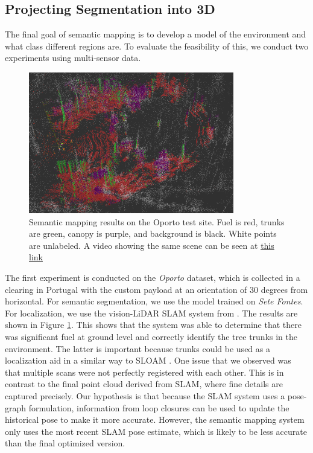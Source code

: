 \subsection{Projecting Segmentation into 3D}
The final goal of semantic mapping is to develop a model of the environment and what class different regions are. To evaluate the feasibility of this, we conduct two experiments using multi-sensor data.

\begin{figure}[h]
    \centering
    \includegraphics[width=0.8\textwidth]{figs/results/semantic_mapping/semantic_cloud_first_approach.png}
    \caption{Semantic mapping results on the Oporto test site. Fuel is red, trunks are green, canopy is purple, and background is black. White points are unlabeled. A video showing the same scene can be seen at \href{https://drive.google.com/file/d/1zulFi7uEZI8R40l-mDwUEBklhR7Kk2_1/view?usp=sharing}{this link}}
    \label{fig:results:semantic_mapping_original}
\end{figure}

The first experiment is conducted on the \textit{Oporto} dataset, which is collected in a clearing in Portugal with the custom payload at an orientation of 30 degrees from horizontal. For semantic segmentation, we use the model trained on \textit{Sete Fontes}. For localization, we use the vision-LiDAR SLAM system from \cite{RussellUnmannedMitigation}.
The results are shown in Figure \ref{fig:results:semantic_mapping_original}. This shows that the system was able to determine that there was significant fuel at ground level and correctly identify the tree trunks in the environment. The latter is important because trunks could be used as a localization aid in a similar way to SLOAM \cite{Chen2020SLOAM:Inventory}. One issue that we observed was that multiple scans were not perfectly registered with each other. This is in contrast to the final point cloud derived from SLAM, where fine details are captured precisely. Our hypothesis is that because the SLAM system uses a pose-graph \cite{Dellaert2017FactorPerception} formulation, information from loop closures can be used to update the historical pose to make it more accurate. However, the semantic mapping system only uses the most recent SLAM pose estimate, which is likely to be less accurate than the final optimized version.


